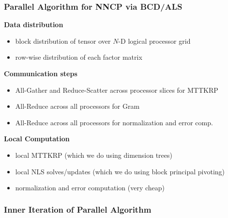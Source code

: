 \documentclass[xcolor=dvipsnames]{beamer}
\begin{document}
\begin{frame}
\frametitle{Parallel Algorithm for NNCP via BCD/ALS}

\footnotesize
\textbf{Data distribution}
\begin{itemize}
	\item block distribution of tensor over $N$-D logical processor grid
	\item row-wise distribution of each factor matrix 
\end{itemize}

\vfill

\textbf{Communication steps}
\begin{itemize}
	\item All-Gather and Reduce-Scatter across processor slices for MTTKRP
	\item All-Reduce across all processors for Gram
	\item All-Reduce across all processors for normalization and error comp.
\end{itemize}

\vfill

\textbf{Local Computation}
\begin{itemize}
	\item local MTTKRP (which we do using dimension trees)
	\item local NLS solves/updates (which we do using block principal pivoting)
	\item normalization and error computation (very cheap)
\end{itemize}


\end{frame}



\begin{frame}
\frametitle{Inner Iteration of Parallel Algorithm}

\begin{center}

\vfill


\end{center}


\end{frame}
\end{document}
